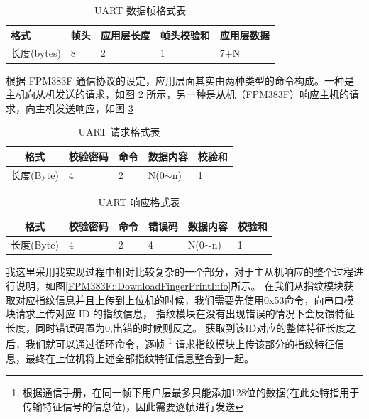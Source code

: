     \begin{table}[H]
        \centering
        \caption{UART 数据帧格式表} \label{FPM383F::UARTdataFrame}
        \begin{tabular}{lllll}
        \hline
        格式        & 帧头 & 应用层长度 & 帧头校验和 & 应用层数据 \\ \hline
        长度(bytes) & 8  & 2     & 1     & 7+N   \\ \hline
        \end{tabular}
    \end{table}
    
    根据 FPM383F 通信协议的设定，应用层面其实由两种类型的命令构成。一种是主机向从机发送的请求，如图 \ref{FPM383F::UARTUserRequest}
    所示，另一种是从机（FPM383F）响应主机的请求，向主机发送响应，如图 \ref{FPM383F::UARTUserResponse}

    \begin{table}[H]
        \centering
        \caption{UART 请求格式表} \label{FPM383F::UARTUserRequest}
        \begin{tabular}{lllll}
        \hline
        \multicolumn{1}{c}{格式} & 校验密码 & 命令 & 数据内容        & 校验和 \\ \hline
        长度(Byte)                 & 4    & 2  & N(0$\sim$n) & 1   \\ \hline
        \end{tabular}
    \end{table}

    \begin{table}[H]
        \centering
        \caption{UART 响应格式表} \label{FPM383F::UARTUserResponse}
        \begin{tabular}{llllll}
        \hline
        \multicolumn{1}{c}{格式} & 校验密码 & 命令 & 错误码 & 数据内容        & 校验和 \\ \hline
        长度(Byte)                 & 4    & 2  & 4   & N(0$\sim$n) & 1   \\ \hline
        \end{tabular}
    \end{table}

    我这里采用我实现过程中相对比较复杂的一个部分，对于主从机响应的整个过程进行说明，如图\ref{FPM383F::DownloadFingerPrintInfo}所示。
    在我们从指纹模块获取对应指纹信息并且上传到上位机的时候，我们需要先使用0x53命令，向串口模块请求上传对应 ID 的指纹信息，
    指纹模块在没有出现错误的情况下会反馈特征长度，同时错误码置为0,出错的时候则反之。
    获取到该ID对应的整体特征长度之后，我们就可以通过循环命令，逐帧
    \footnote{根据通信手册，在同一帧下用户层最多只能添加128位的数据(在此处特指用于传输特征信号的信息位)，因此需要逐帧进行发送}
    请求指纹模块上传该部分的指纹特征信息，最终在上位机将上述全部指纹特征信息整合到一起。

